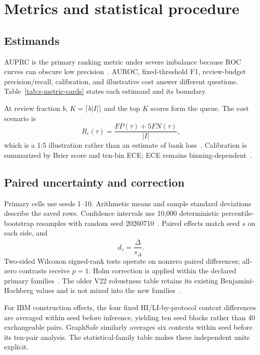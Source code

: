 \section{Metrics and statistical procedure}
\label{sec:s-statistics-v2}

\subsection{Estimands}

AUPRC is the primary ranking metric under severe imbalance because ROC curves can obscure low precision~\cite{saito2015pr}. AUROC, fixed-threshold F1, review-budget precision/recall, calibration, and illustrative cost answer different questions. Table~\ref{tab:s-metric-cards} states each estimand and its boundary.



At review fraction \(b\), \(K=\lceil b|I|\rceil\) and the top \(K\) scores form the queue. The cost scenario is
\begin{equation}
 R_c(\tau)=\frac{FP(\tau)+5FN(\tau)}{|I|},
\end{equation}
which is a 1:5 illustration rather than an estimate of bank loss~\cite{bahnsen2015cost}. Calibration is summarized by Brier score and ten-bin ECE; ECE remains binning-dependent~\cite{guo2017calibration}.

\subsection{Paired uncertainty and correction}

Primary cells use seeds 1--10. Arithmetic means and sample standard deviations describe the saved rows. Confidence intervals use 10,000 deterministic percentile-bootstrap resamples with random seed 20260710~\cite{efron1979bootstrap}. Paired effects match seed \(s\) on each side, and
\begin{equation}
 d_z=\frac{\overline{\Delta}}{s_\Delta}.
\end{equation}
Two-sided Wilcoxon signed-rank tests operate on nonzero paired differences; all-zero contrasts receive \(p=1\). Holm correction is applied within the declared primary families~\cite{holm1979}. The older V22 robustness table retains its existing Benjamini-Hochberg values and is not mixed into the new families~\cite{benjamini1995}.



For IBM construction effects, the four fixed HI/LI-by-protocol context differences are averaged within seed before inference, yielding ten seed blocks rather than 40 exchangeable pairs. GraphSafe similarly averages six contexts within seed before its ten-pair analysis. The statistical-family table makes these independent units explicit.

